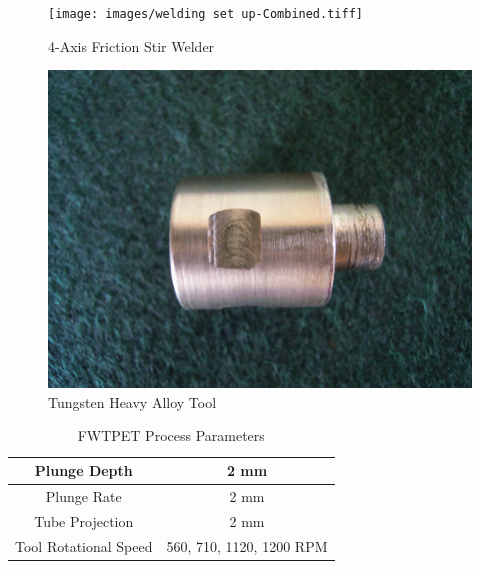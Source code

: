 \documentclass[3p]{elsarticle}
\begin{document}
\begin{figure}[H]
\centering
\texttt{[image: images/welding set up-Combined.tiff]}
\caption{4-Axis Friction Stir Welder}
\label{fig:fsw-machine}
\end{figure}

\begin{figure}[H]
\centering
\includegraphics[width=\textwidth]{images/Tool.jpg}
\caption{Tungsten Heavy Alloy Tool}
\label{fig:backing-block}
\end{figure}

\begin{table}[!htbp]
\caption{FWTPET Process Parameters}
\centering
\begin{tabular}{|c|c|}
\hline 
Plunge Depth & 2 mm \\ 
\hline 
Plunge Rate & 2 mm \\ 
\hline 
Tube Projection & 2 mm \\ 
\hline 
Tool Rotational Speed & 560, 710, 1120, 1200 RPM \\ 
\hline 
\end{tabular} 
\label{table:process-parameters} %
\end{table}
\end{document}
